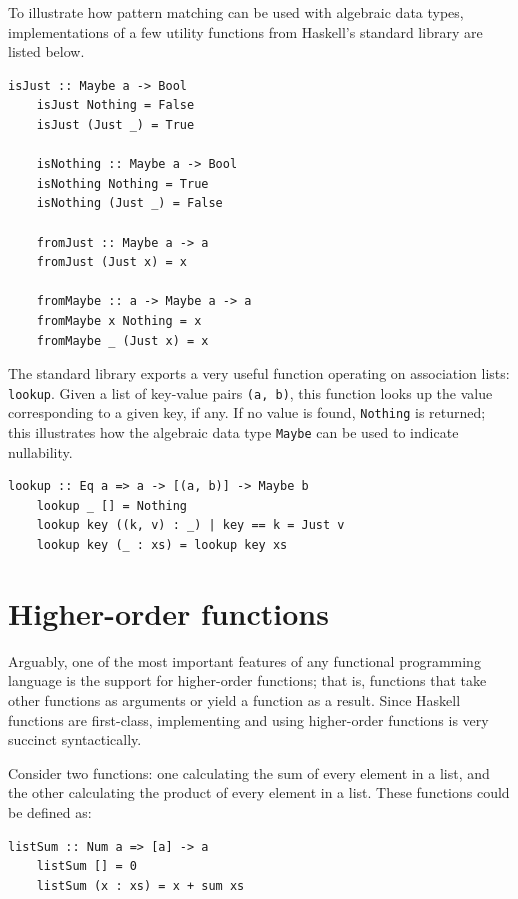 \documentclass[UdineBachThesis,american,11pt]{PhdThesis}
\begin{document}
  To illustrate how pattern matching can be used with algebraic data types,
  implementations of a few utility functions from Haskell's standard library are
  listed below.

  \begin{Verbatim}[gobble=4,fontsize=\small]
    isJust :: Maybe a -> Bool
    isJust Nothing = False
    isJust (Just _) = True

    isNothing :: Maybe a -> Bool
    isNothing Nothing = True
    isNothing (Just _) = False

    fromJust :: Maybe a -> a
    fromJust (Just x) = x

    fromMaybe :: a -> Maybe a -> a
    fromMaybe x Nothing = x
    fromMaybe _ (Just x) = x
  \end{Verbatim}

  The standard library exports a very useful function operating on association
  lists: \mbox{\texttt{lookup}}. Given a list of key-value pairs
  \mbox{\texttt{(a, b)}}, this function looks up the value corresponding to a
  given key, if any. If no value is found, \mbox{\texttt{Nothing}} is returned;
  this illustrates how the algebraic data type \mbox{\texttt{Maybe}} can be used
  to indicate nullability.

  \begin{Verbatim}[gobble=4,fontsize=\small]
    lookup :: Eq a => a -> [(a, b)] -> Maybe b
    lookup _ [] = Nothing
    lookup key ((k, v) : _) | key == k = Just v
    lookup key (_ : xs) = lookup key xs
  \end{Verbatim}

  \section{Higher-order functions}
  \label{section:higher-order-functions}

  Arguably, one of the most important features of any functional programming
  language is the support for higher-order functions; that is, functions that
  take other functions as arguments or yield a function as a result. Since
  Haskell functions are first-class, implementing and using higher-order
  functions is very succinct syntactically.

  Consider two functions: one calculating the sum of every element in a list,
  and the other calculating the product of every element in a list. These
  functions could be defined as:

  \begin{Verbatim}[gobble=4,fontsize=\small]
    listSum :: Num a => [a] -> a
    listSum [] = 0
    listSum (x : xs) = x + sum xs
  \end{Verbatim}
\end{document}
